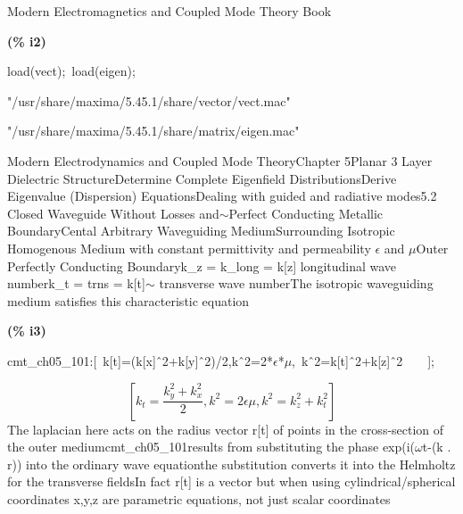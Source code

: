 \documentclass[fleqn]{article}
\begin{document}
Modern Electromagnetics and Coupled Mode Theory Book


\noindent
\begin{minipage}[t]{4.000000em}\color{red}\bfseries
(\% i2)	
\end{minipage}
\begin{minipage}[t]{\textwidth}\color{blue}
load(vect);\ load(eigen);
\end{minipage}
\[\displaystyle \tag{\% o1} 
\mbox{}
\]"/usr/share/maxima/5.45.1/share/vector/vect.mac"


\[\tag{\% o2} 
\mbox{}
\]"/usr/share/maxima/5.45.1/share/matrix/eigen.mac"

Modern Electrodynamics and Coupled Mode TheoryChapter 5Planar 3 Layer Dielectric StructureDetermine Complete Eigenfield DistributionsDerive Eigenvalue (Dispersion) EquationsDealing with guided and radiative modes5.2 Closed Waveguide Without Losses and\ensuremath{\sim }Perfect Conducting Metallic BoundaryCental Arbitrary Waveguiding MediumSurrounding Isotropic Homogenous Medium with constant permittivity and permeability \ensuremath{\epsilon} and \ensuremath{\mu}Outer Perfectly Conducting Boundaryk\_z = k\_long = k[z]      longitudinal wave numberk\_t = trns = k[t]\ensuremath{\sim }         transverse wave numberThe isotropic waveguiding medium satisfies this characteristic equation


\noindent
\begin{minipage}[t]{4.000000em}\color{red}\bfseries
(\% i3)	
\end{minipage}
\begin{minipage}[t]{\textwidth}\color{blue}
cmt\_ch05\_101:[\ k[t]=(k[x]\^\ 2+k[y]\^\ 2)/2,k\^\ 2=2*\ensuremath{\epsilon}*\ensuremath{\mu},\ k\^\ 2=k[t]\^\ 2+k[z]\^\ 2\ \ \ \ ];
\end{minipage}
\[\displaystyle \tag{\% o3} 
\left[ {k_t}=\frac{{{k}_{y}^{2}}+{{k}_{x}^{2}}}{2}\operatorname{,}{{k}^{2}}=2 \epsilon  \mu \operatorname{,}{{k}^{2}}={{k}_{z}^{2}}+{{k}_{t}^{2}}\right] \mbox{}
\]
The laplacian here acts on the radius vector r[t] of points in the cross-section of the outer mediumcmt\_ch05\_101results from substituting the phase exp(i(\ensuremath{\omega}t-(k . r)) into the ordinary wave equationthe substitution converts it into the Helmholtz for the transverse fieldsIn fact r[t] is a vector but when using cylindrical/spherical coordinates x,y,z are parametric equations, not just scalar coordinates
\end{document}
